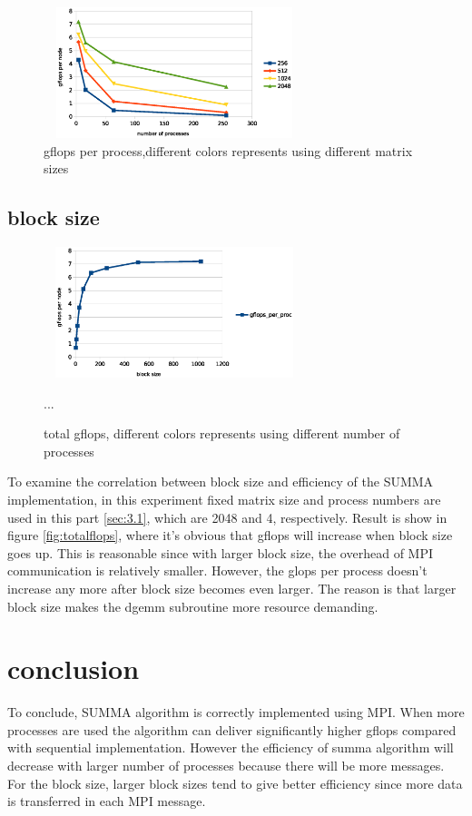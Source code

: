 \documentclass{ics-paper}
\begin{document}
\begin{figure}
	\includegraphics[height=1.5in, width=3in]{scale}
	\caption{gflops per process,different colors represents using different matrix sizes}
	\label{fig:scale}
\end{figure}


\label{sec:3.1}
\subsection{block size}
\begin{figure}
	\includegraphics[height=1.5in, width=3in]{blocksize}
	\caption{total gflops, different colors represents using different number of processes}
	\label{fig:blocksize}...
\end{figure}
To examine the correlation between block size and efficiency of the SUMMA implementation, in this experiment fixed matrix size and process numbers are used in this part \ref{sec:3.1}, which are 2048 and 4, respectively. Result is show in figure \ref{fig:totalflops}, where it's obvious that gflops will increase when block size goes up. This is reasonable since with larger block size, the overhead of MPI communication is relatively smaller.
However, the glops per process doesn't increase any more after block size becomes even larger. The reason is that larger block size makes the dgemm subroutine more resource demanding.

\section{conclusion}
To conclude, SUMMA algorithm is correctly implemented using MPI. When more processes are used the algorithm can deliver significantly higher gflops compared with sequential implementation. However the efficiency of summa algorithm will decrease with larger number of processes because there will be more messages. For the block size, larger block sizes tend to give better efficiency since more data is transferred in each MPI message.



\end{document}
